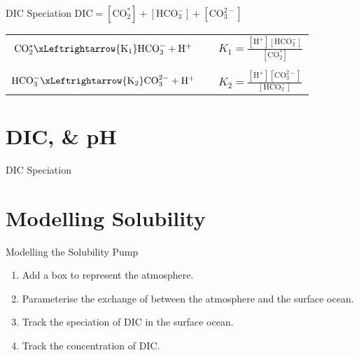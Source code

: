 \begin{frame}{DIC Speciation}
\centering
$ \mathrm{DIC = [CO_2^*] + [HCO_3^-] + [CO_3^{2-}]} $
\bigskip\bigskip

\begin{tabular}{ccl}
    $\mathrm{CO_2^* \xLeftrightarrow{K_1} HCO_3^- + H^+}$ && $K_1 = \mathrm{\frac{[H^+][HCO_3^-]}{[CO_2^*]}}$ \\
    \bigskip && \\
    $\mathrm{HCO_3^- \xLeftrightarrow{K_2} CO_3^{2-} + H^+}$ && $K_2 = \mathrm{\frac{[H^+][CO_3^{2-}]}{[HCO_3^-]}}$ \\
\end{tabular}


\end{frame}



\section{DIC,  \& pH}


\begin{frame}{DIC Speciation}

\end{frame}

\section{Modelling Solubility}

\begin{frame}{Modelling the Solubility Pump}

\begin{enumerate}
    \item Add a box to represent the atmosphere.
    \item Parameterise the exchange of  between the atmosphere and the surface ocean.
    \item Track the speciation of DIC in the surface ocean.
    \item Track the concentration of DIC.
\end{enumerate}

\end{frame}




